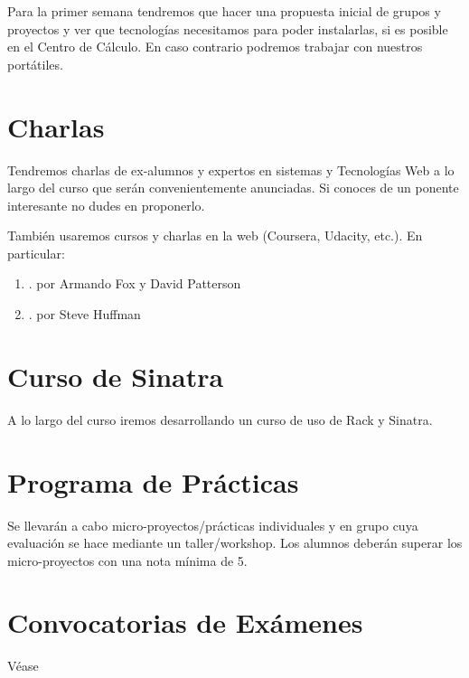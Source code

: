 \documentclass[11pt,a4paper]{article}
\begin{document}
Para la primer semana tendremos que hacer una propuesta inicial de grupos y proyectos y ver que tecnologías necesitamos para poder instalarlas,
si es posible en el Centro de Cálculo. En caso contrario podremos trabajar con nuestros portátiles.

\section{Charlas}
Tendremos charlas de ex-alumnos y expertos en sistemas y Tecnologías Web a lo largo del curso que serán convenientemente anunciadas.
Si conoces de un ponente interesante no dudes en proponerlo.


También usaremos cursos y charlas en la web (Coursera, Udacity, etc.). En particular:
\begin{enumerate}
\item {}.  por Armando Fox y David Patterson
\item {}.  por Steve Huffman
\end{enumerate}

\section{Curso de Sinatra}
A lo largo del curso iremos desarrollando un curso de uso de Rack y Sinatra.

\section{Programa de Pr\'acticas}

Se llevarán a cabo micro-proyectos/prácticas individuales y en grupo cuya evaluación se hace mediante un 
taller/workshop. Los alumnos deberán superar los micro-proyectos con una nota mínima de 5. 

\section{Convocatorias de Exámenes}
Véase
\end{document}
